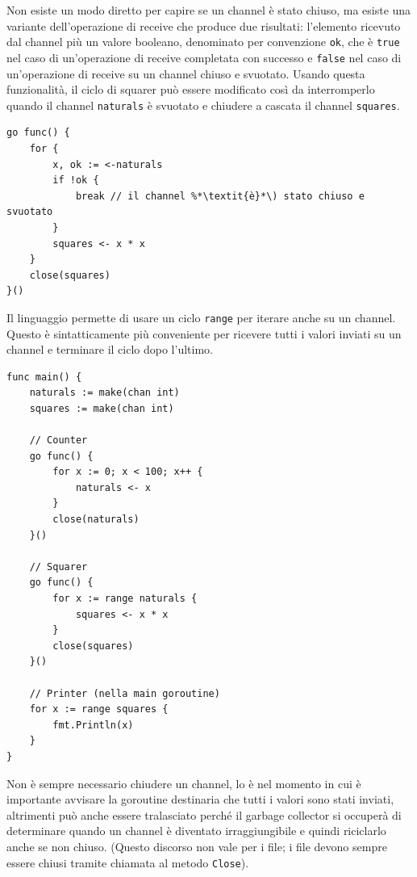 Non esiste un modo diretto per capire se un channel è stato chiuso, ma esiste una variante dell'operazione di receive che produce due risultati: l'elemento ricevuto dal channel più un valore booleano, denominato per convenzione \verb|ok|, che è \verb|true| nel caso di un'operazione di receive completata con successo e \verb|false| nel caso di un'operazione di receive su un channel chiuso e svuotato.
Usando questa funzionalità, il ciclo di squarer può essere modificato così da interromperlo quando il channel \verb|naturals| è svuotato e chiudere a cascata il channel \verb|squares|.
\begin{lstlisting}[frame=single, label={lst:lstlisting7-4-2.3}]
go func() {
    for {
        x, ok := <-naturals
        if !ok {
            break // il channel %*\textit{è}*\) stato chiuso e svuotato
        }
        squares <- x * x
    }
    close(squares)
}()
\end{lstlisting}
Il linguaggio permette di usare un ciclo \verb|range| per iterare anche su un channel.
Questo è sintatticamente più conveniente per ricevere tutti i valori inviati su un channel e terminare il ciclo dopo l'ultimo.
\begin{lstlisting}[frame=single, label={lst:lstlisting7-4-2.4}]
func main() {
    naturals := make(chan int)
    squares := make(chan int)

    // Counter
    go func() {
        for x := 0; x < 100; x++ {
            naturals <- x
        }
        close(naturals)
    }()

    // Squarer
    go func() {
        for x := range naturals {
            squares <- x * x
        }
        close(squares)
    }()

    // Printer (nella main goroutine)
    for x := range squares {
        fmt.Println(x)
    }
}
\end{lstlisting}
Non è sempre necessario chiudere un channel, lo è nel momento in cui è importante avvisare la goroutine destinaria che tutti i valori sono stati inviati, altrimenti può anche essere tralasciato perché il garbage collector si occuperà di determinare quando un channel è diventato irraggiungibile e quindi riciclarlo anche se non chiuso.
(Questo discorso non vale per i file;
i file devono sempre essere chiusi tramite chiamata al metodo \verb|Close|).

